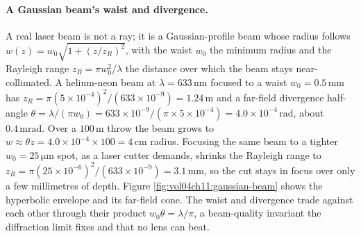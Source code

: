 \paragraph{A Gaussian beam's waist and divergence.} A real laser beam is not
a ray; it is a Gaussian-profile beam whose radius follows
$w(z) = w_{0}\sqrt{1 + (z/z_{R})^{2}}$, with the waist $w_{0}$ the minimum
radius and the Rayleigh range $z_{R} = \pi w_{0}^{2}/\lambda$ the distance
over which the beam stays near-collimated. A helium-neon beam at
$\lambda = 633\,\si{\nano\meter}$ focused to a waist
$w_{0} = 0.5\,\si{\milli\meter}$ has $z_{R} = \pi(5\times10^{-4})^{2}/
(633\times10^{-9}) = 1.24\,\si{\meter}$ and a far-field divergence half-angle
$\theta = \lambda/(\pi w_{0}) = 633\times10^{-9}/(\pi\times 5\times10^{-4}) =
4.0\times10^{-4}\,\si{\radian}$, about $0.4\,\si{\milli\radian}$. Over a
$100\,\si{\meter}$ throw the beam grows to
$w \approx \theta z = 4.0\times10^{-4}\times 100 = 4\,\si{\centi\meter}$
radius. Focusing the same beam to a tighter $w_{0} = 25\,\si{\micro\meter}$
spot, as a laser cutter demands, shrinks the Rayleigh range to
$z_{R} = \pi(25\times10^{-6})^{2}/(633\times10^{-9}) = 3.1\,\si{\milli
\meter}$, so the cut stays in focus over only a few millimetres of depth.
Figure \ref{fig:vol04ch11:gaussian-beam} shows the hyperbolic envelope and
its far-field cone. The waist and divergence trade against each other through
their product $w_{0}\theta = \lambda/\pi$, a beam-quality invariant the
diffraction limit fixes and that no lens can beat.




